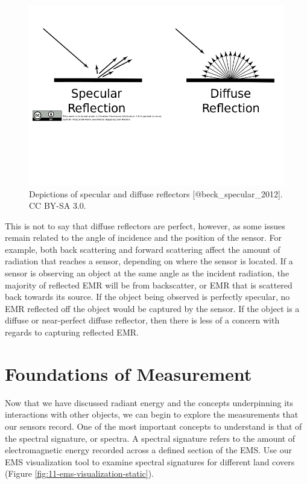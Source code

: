 \documentclass[
]{book}
\begin{document}
\begin{figure}
\includegraphics[width=0.75\linewidth,height=0.75\textheight]{images/11-reflectors} \caption{Depictions of specular and diffuse reflectors [@beck_specular_2012]. CC BY-SA 3.0.}\label{fig:11-reflectors}
\end{figure}

This is not to say that diffuse reflectors are perfect, however, as some
issues remain related to the angle of incidence and the position of the
sensor. For example, both back scattering and forward scattering affect
the amount of radiation that reaches a sensor, depending on where the
sensor is located. If a sensor is observing an object at the same angle
as the incident radiation, the majority of reflected EMR will be from
backscatter, or EMR that is scattered back towards its source. If the
object being observed is perfectly specular, no EMR reflected off the
object would be captured by the sensor. If the object is a diffuse or
near-perfect diffuse reflector, then there is less of a concern with
regards to capturing reflected EMR.

\hypertarget{foundations-of-measurement}{%
\section{Foundations of Measurement}\label{foundations-of-measurement}}

Now that we have discussed radiant energy and the concepts
underpinning its interactions with other objects, we can begin to
explore the measurements that our sensors record. One of the most
important concepts to understand is that of the spectral signature, or
spectra. A spectral signature refers to the amount of electromagnetic
energy recorded across a defined section of the EMS. Use our EMS visualization tool to examine spectral signatures for different land covers (Figure
\ref{fig:11-ems-visualization-static}).
\end{document}
